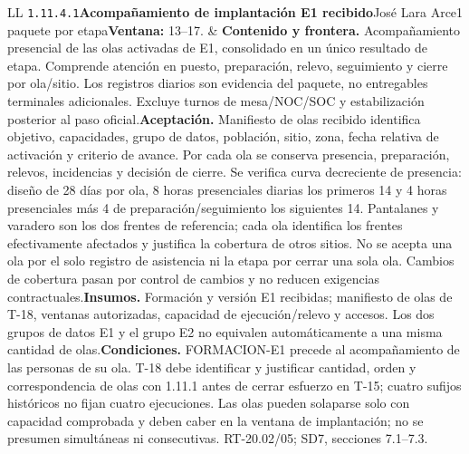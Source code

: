 \begin{longtable}{L{\tabcolsep\relax}L{\tabcolsep\relax}}
\texttt{1.\allowbreak{}11.\allowbreak{}4.\allowbreak{}1}\newline{}\textbf{Acompañamiento de implantación E1 recibido}\newline{}José Lara Arce\newline{}1 paquete por etapa\newline{}\textbf{Ventana:} 13--17. & \textbf{Contenido y frontera.} Acompañamiento presencial de las olas activadas de E1, consolidado en un único resultado de etapa. Comprende atención en puesto, preparación, relevo, seguimiento y cierre por ola/sitio. Los registros diarios son evidencia del paquete, no entregables terminales adicionales. Excluye turnos de mesa/NOC/SOC y estabilización posterior al paso oficial.\newline{}\textbf{Aceptación.} Manifiesto de olas recibido identifica objetivo, capacidades, grupo de datos, población, sitio, zona, fecha relativa de activación y criterio de avance. Por cada ola se conserva presencia, preparación, relevos, incidencias y decisión de cierre. Se verifica curva decreciente de presencia: diseño de 28 días por ola, 8 horas presenciales diarias los primeros 14 y 4 horas presenciales más 4 de preparación/seguimiento los siguientes 14. Pantalanes y varadero son los dos frentes de referencia; cada ola identifica los frentes efectivamente afectados y justifica la cobertura de otros sitios. No se acepta una ola por el solo registro de asistencia ni la etapa por cerrar una sola ola. Cambios de cobertura pasan por control de cambios y no reducen exigencias contractuales.\newline{}\textbf{Insumos.} Formación y versión E1 recibidas; manifiesto de olas de T-18, ventanas autorizadas, capacidad de ejecución/relevo y accesos. Los dos grupos de datos E1 y el grupo E2 no equivalen automáticamente a una misma cantidad de olas.\newline{}\textbf{Condiciones.} FORMACION-E1 precede al acompañamiento de las personas de su ola. T-18 debe identificar y justificar cantidad, orden y correspondencia de olas con 1.11.1 antes de cerrar esfuerzo en T-15; cuatro sufijos históricos no fijan cuatro ejecuciones. Las olas pueden solaparse solo con capacidad comprobada y deben caber en la ventana de implantación; no se presumen simultáneas ni consecutivas. RT-20.02/05; SD7, secciones 7.1--7.3.\\\hline

\end{longtable}
